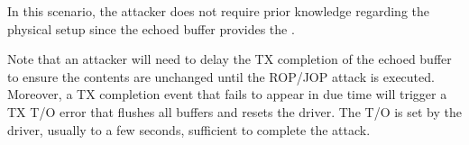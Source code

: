 
In this scenario, the attacker does not require prior knowledge regarding the physical setup since the echoed buffer provides the \kva.  

Note that an attacker will need to delay the TX completion of the echoed buffer to ensure the contents are unchanged until the ROP/JOP attack is executed.
Moreover, a TX completion event that fails to appear in due time will trigger a TX T/O error that flushes all buffers and resets the driver. The T/O is set by the driver, usually to a few seconds, sufficient to complete the attack.
 








